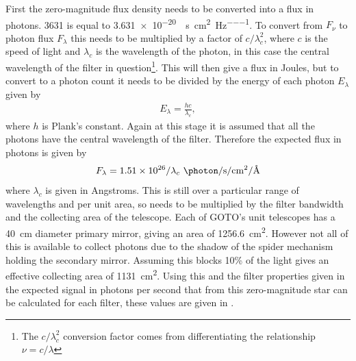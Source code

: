\begin{colsection}
\begin{colsection}
First the zero-magnitude flux density needs to be converted into a flux in photons. \SI{3631}{\jansky} is equal to \SI{3.631e-20}{\erg\per\second\per\centi\metre\squared\per\hertz}. To convert from $F_\nu$ to photon flux $F_\lambda$ this needs to be multiplied by a factor of $c/\lambda_c^2$, where $c$ is the speed of light and $\lambda_c$ is the wavelength of the photon, in this case the central wavelength of the filter in question\footnote{The $c/\lambda_c^2$ conversion factor comes from differentiating the relationship $\nu = c/\lambda$}. This will then give a flux in Joules, but to convert to a photon count it needs to be divided by the energy of each photon $E_\lambda$ given by
%
\begin{equation}
    \begin{split}
        E_\lambda = \frac{hc}{\lambda_c},
    \end{split}
    \label{eq:photon_energy}
\end{equation}
%
where $h$ is Plank's constant. Again at this stage it is assumed that all the photons have the central wavelength of the filter. Therefore the expected flux in photons is given by
%
\begin{equation}
    \begin{split}
        F_\lambda = 1.51 \times 10^{26}/\lambda_c~\si{\photon\per\second\per\centi\metre\squared\per\angstrom}
    \end{split}
    \label{eq:zero-mag_photons}
\end{equation}
%
where $\lambda_c$ is given in Angstroms. This is still over a particular range of wavelengths and per unit area, so needs to be multiplied by the filter bandwidth and the collecting area of the telescope. Each of GOTO's unit telescopes has a \SI{40}{\centi\metre} diameter primary mirror, giving an area of \SI{1256.6}{\centi\metre\squared}. However not all of this is available to collect photons due to the shadow of the spider mechanism holding the secondary mirror. Assuming this blocks 10\% of the light gives an effective collecting area of \SI{1131}{\centi\metre\squared}. Using this and the filter properties given in  the expected signal in photons per second that from this zero-magnitude star can be calculated for each filter, these values are given in .


\end{colsection}
\end{colsection}
